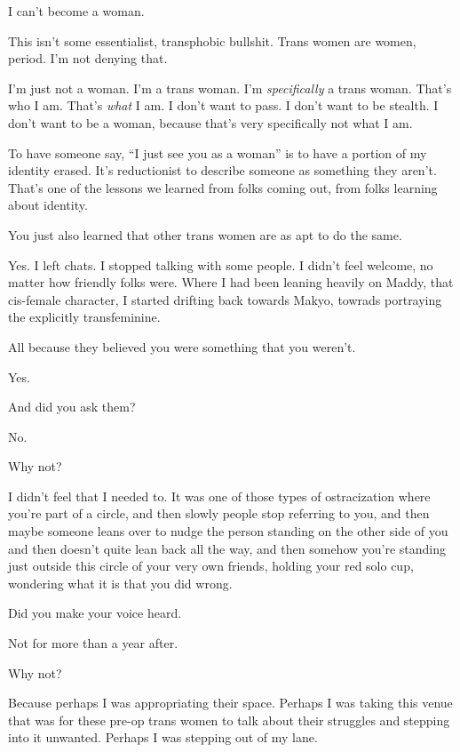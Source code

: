 I can't become a woman.

This isn't some essentialist, transphobic bullshit. Trans women are women, period. I'm not denying that.

I'm just not a woman. I'm a trans woman. I'm \emph{specifically} a trans woman. That's who I am. That's \emph{what} I am. I don't want to pass. I don't want to be stealth. I don't want to be a woman, because that's very specifically not what I am.

To have someone say, ``I just see you as a woman'' is to have a portion of my identity erased. It's reductionist to describe someone as something they aren't. That's one of the lessons we learned from folks coming out, from folks learning about identity.

\begin{ally}
You just also learned that other trans women are as apt to do the same.
\end{ally}
Yes. I left chats. I stopped talking with some people. I didn't feel welcome, no matter how friendly folks were. Where I had been leaning heavily on Maddy, that cis-female character, I started drifting back towards Makyo, towrads portraying the explicitly transfeminine.

\begin{ally}
All because they believed you were something that you weren't.
\end{ally}
Yes.

\begin{ally}
And did you ask them?
\end{ally}
No.

\begin{ally}
Why not?
\end{ally}
I didn't feel that I needed to. It was one of those types of ostracization where you're part of a circle, and then slowly people stop referring to you, and then maybe someone leans over to nudge the person standing on the other side of you and then doesn't quite lean back all the way, and then somehow you're standing just outside this circle of your very own friends, holding your red solo cup, wondering what it is that you did wrong.

\begin{ally}
Did you make your voice heard.
\end{ally}
Not for more than a year after.

\begin{ally}
Why not?
\end{ally}
Because perhaps I was appropriating their space. Perhaps I was taking this venue that was for these pre-op trans women to talk about their struggles and stepping into it unwanted. Perhaps I was stepping out of my lane.

